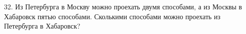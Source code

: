32. Из Петербурга в Москву можно проехать двумя способами, а из Москвы в Хабаровск пятью способами. Сколькими способами можно проехать из Петербурга в Хабаровск?\\
